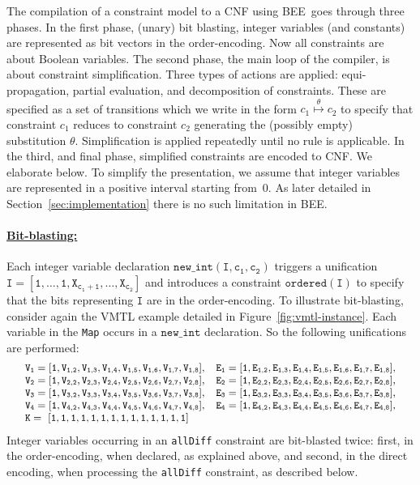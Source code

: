 \documentclass{tlp}
\newcommand{\bee}{\textsf{BEE}}
\begin{document}
The compilation of a constraint model to a CNF
using \bee\ goes through three phases. 
In the first phase, (unary) bit blasting, integer variables (and
constants) are represented as bit vectors in the order-encoding. Now
all constraints are about Boolean variables.
The second phase, the main loop of the compiler, is about constraint
simplification.  Three types of actions are applied: equi-propagation,
partial evaluation, and decomposition of constraints. These are
specified as a set of transitions which we write in the form
$c_1\overset{\theta}{\longmapsto}c_2$ to specify that constraint $c_1$
reduces to constraint $c_2$ generating the (possibly empty)
substitution $\theta$. Simplification is applied repeatedly until no
rule is applicable.
In the third, and final phase, simplified constraints are encoded to
CNF. We elaborate below.
To simplify the presentation, we assume that integer variables are
represented in a positive interval starting from~$0$. As later
detailed in Section~\ref{sec:implementation} there is no such
limitation in \bee.



\vspace{-3mm}
\paragraph{\underline{Bit-blasting:}} 

Each integer variable declaration
$\mathtt{new\_int(I,c_1,c_2)}$ triggers a unification
$\mathtt{I=[1,\dots,1,X_{c_1+1},\ldots,X_{c_2}]}$ and introduces a
constraint $\mathtt{ordered(I)}$ to specify that the bits representing
$\mathtt{I}$ are in the order-encoding.  
To illustrate bit-blasting, consider again the VMTL
example detailed in Figure~\ref{fig:vmtl-instance}. Each variable in
the \texttt{Map} occurs in a $\mathtt{new\_int}$ declaration. So the
following unifications are performed:
\[{\small\begin{array}{ll}
\mathtt{V_{1}=[1,V_{1,2},V_{1,3},V_{1,4},V_{1,5},V_{1,6},V_{1,7},V_{1,8}]}, &
\mathtt{E_{1}=[1,E_{1,2},E_{1,3},E_{1,4},E_{1,5},E_{1,6},E_{1,7},E_{1,8}]}, \\
\mathtt{V_{2}=[1,V_{2,2},V_{2,3},V_{2,4},V_{2,5},V_{2,6},V_{2,7},V_{2,8}]}, &
\mathtt{E_{2}=[1,E_{2,2},E_{2,3},E_{2,4},E_{2,5},E_{2,6},E_{2,7},E_{2,8}]}, \\
\mathtt{V_{3}=[1,V_{3,2},V_{3,3},V_{3,4},V_{3,5},V_{3,6},V_{3,7},V_{3,8}]}, &
\mathtt{E_{3}=[1,E_{3,2},E_{3,3},E_{3,4},E_{3,5},E_{3,6},E_{3,7},E_{3,8}]}, \\
\mathtt{V_{4}=[1,V_{4,2},V_{4,3},V_{4,4},V_{4,5},V_{4,6},V_{4,7},V_{4,8}]}, & 
\mathtt{E_{4}=[1,E_{4,2},E_{4,3},E_{4,4},E_{4,5},E_{4,6},E_{4,7},E_{4,8}]},\\
\mathtt{K=~[1,1,1,1,1,1,1,1,1,1,1,1,1,1]}&
\end{array}}\]
Integer variables occurring in an \texttt{allDiff} constraint are
bit-blasted twice: first, in the order-encoding, when declared, as
explained above, and second, in the direct encoding, when processing
the \texttt{allDiff} constraint, as described below.
\end{document}
